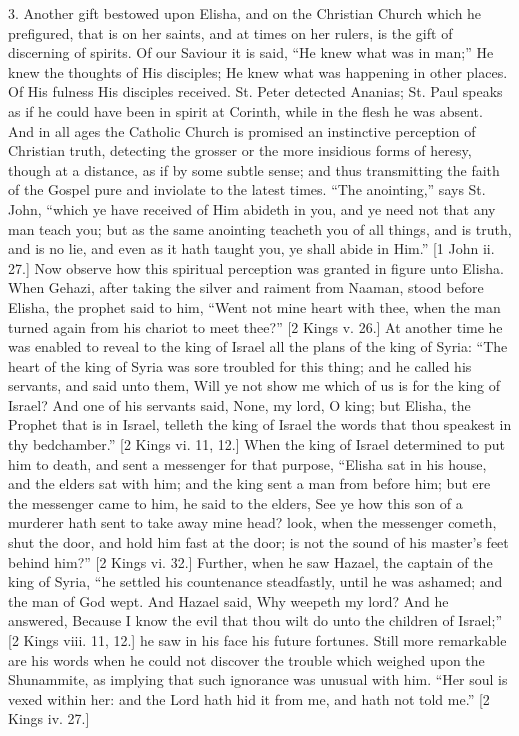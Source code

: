 3. Another gift bestowed upon Elisha, and on the Christian Church
which he prefigured, that is on her saints, and at times on her
rulers, is the gift of discerning of spirits. Of our Saviour it is
said, ``He knew what was in man;'' He knew the thoughts of His
disciples; He knew what was happening in other places. Of His fulness
His disciples received. St. Peter detected Ananias; St. Paul speaks as
if he could have been in spirit at Corinth, while in the flesh he was
absent. And in all ages the Catholic Church is promised an instinctive
perception of Christian truth, detecting the grosser or the more
insidious forms of heresy, though at a distance, as if by some subtle
sense; and thus transmitting the faith of the Gospel pure and
inviolate to the latest times. ``The anointing,'' says St.
John, ``which ye have received of Him abideth in you, and ye need
not that any man teach you; but as the same anointing teacheth you of
all things, and is truth, and is no lie, and even as it hath taught
you, ye shall abide in Him.'' [1 John ii. 27.] Now observe how
this spiritual perception was granted in figure unto Elisha. When
Gehazi, after taking the silver and raiment from Naaman, stood before
Elisha, the prophet said to him, ``Went not mine heart with thee,
when the man turned again from his chariot to meet thee?'' [2
Kings v. 26.] At another time he was enabled to reveal to the king of
Israel all the plans of the king of Syria: ``The heart of the king
of Syria was sore troubled for this thing; and he called his servants,
and said unto them, Will ye not show me which of us is for the king of
Israel? And one of his servants said, None, my lord, O king; but
Elisha, the Prophet that is in Israel, telleth the king of Israel the
words that thou speakest in thy bedchamber.'' [2 Kings vi. 11,
12.] When the king of Israel determined to put him to death, and sent
a messenger for that purpose, ``Elisha sat in his house, and the
elders sat with him; and the king sent a man from before him; but ere
the messenger came to him, he said to the elders, See ye how this son
of a murderer hath sent to take away mine head? look, when the
messenger cometh, shut the door, and hold him fast at the door; is not
the sound of his master's feet behind him?'' [2 Kings vi. 32.]
Further, when he saw Hazael, the captain of the king of Syria,
``he settled his countenance steadfastly, until he was ashamed;
and the man of God wept. And Hazael said, Why weepeth my lord? And he
answered, Because I know the evil that thou wilt do unto the children
of Israel;'' [2 Kings viii. 11, 12.] he saw in his face his future
fortunes. Still more remarkable are his words when he could not
discover the trouble which weighed upon the Shunammite, as implying
that such ignorance was unusual with him. ``Her soul is vexed
within her: and the Lord hath hid it from me, and hath not told
me.'' [2 Kings iv. 27.]

